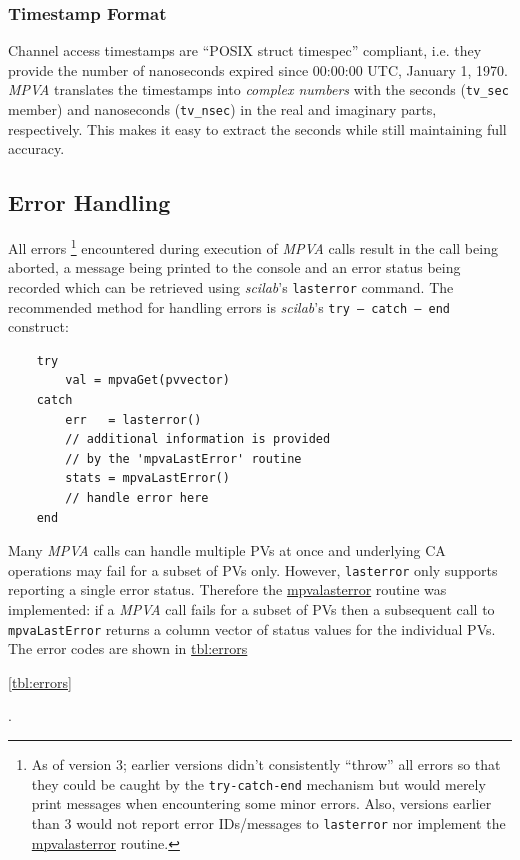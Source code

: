 \documentclass{article}
\newcommand{\sca}{\ita{MPVA}}
\newcommand{\scilab}{\ita{scilab}}
\newcommand{\com}[1]{{\tt #1}}
\newcommand{\comref}[2]{\hyperref{\com{#1}}{\com{#1} (see }{)}{#2}}
\newcommand{\ita}[1]{\emph{#1}}
\begin{document}
\subsubsection{Timestamp Format}
\label{tsformat}
Channel access timestamps are ``POSIX struct timespec''
compliant, i.e. they provide the number of nanoseconds
expired since 00:00:00 UTC, January 1, 1970. \sca{} 
translates the timestamps into \ita{complex numbers}
with the seconds (\com{tv\_sec} member) and nanoseconds
(\com{tv\_nsec}) in the real and imaginary parts, respectively.
This makes it easy to extract the seconds while still maintaining
full accuracy.

\subsection{Error Handling}
\label{errorhandling}
All errors%
\footnote{As of version 3; earlier versions didn't consistently
``throw'' all errors so that they could be caught by the
\com{try-catch-end} mechanism but would merely print messages
when encountering some minor errors. Also, versions earlier than 3
would not report error IDs/messages to \com{lasterror} nor
implement the \comref{mpvaLastError}{mpvalasterror} routine.}
encountered during execution of \sca{} calls result in the
call being aborted, a message being printed to the console
and an error status being recorded which
can be retrieved using \scilab{}'s \com{lasterror} command.
The recommended method for handling errors is \scilab{}'s
\mbox{\com{try -- catch -- end}} construct:
\begin{verbatim}
	try
		val = mpvaGet(pvvector)
	catch
		err   = lasterror()
		// additional information is provided
		// by the 'mpvaLastError' routine
		stats = mpvaLastError()
		// handle error here
	end
\end{verbatim}
Many \sca{} calls can handle multiple PVs at once
and underlying CA operations may fail for a subset of PVs only.
However, \com{lasterror} only supports reporting a single error
status. Therefore the \comref{mpvaLastError}{mpvalasterror} routine
was implemented: if a \sca{} call fails for a subset of PVs then
a subsequent call to \com{mpvaLastError} returns a column vector
of status values for the individual PVs.
The error codes are shown in
\hyperref{Table~}{Table~}{}{tbl:errors}%
\begin{htmlonly}
\ref{tbl:errors}%
\end{htmlonly}
.
\end{document}
